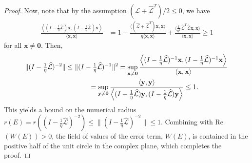 \documentclass[review]{siamart}
\begin{document}
\begin{proof}
Now, note that by the assumption $(\widehat{\mathcal{L}}+\widehat{\mathcal{L}}^T)/2 \leq 0$, we have
%
\begin{align}\label{eq:norm1}
\frac{\left\langle (I - \tfrac{1}{\eta}\widehat{\mathcal{L}})\mathbf{x},(I - \tfrac{1}{\eta}\widehat{\mathcal{L}})\mathbf{x}\right\rangle}
	{\langle\mathbf{x},\mathbf{x}\rangle} 
& = 1 - \frac{\langle (\widehat{\mathcal{L}} + \widehat{\mathcal{L}}^T )
	\mathbf{x},\mathbf{x}\rangle}{\eta \langle\mathbf{x},\mathbf{x}\rangle} +
	\frac{\langle \tfrac{1}{\eta^2}\widehat{\mathcal{L}}^T\widehat{\mathcal{L}}\mathbf{x},
	\mathbf{x}\rangle}{\langle\mathbf{x},\mathbf{x}\rangle}
\geq 1
\end{align}
%
for all $\mathbf{x}\neq\mathbf{0}$. Then,
%
\begin{align*}
\|(I - \tfrac{1}{\eta}\widehat{\mathcal{L}})^{-2}\| \leq \|(I - \tfrac{1}{\eta}\widehat{\mathcal{L}})^{-1}\|^2
& = \sup_{\mathbf{x}\neq\mathbf{0}} 
	\frac{\left\langle (I - \tfrac{1}{\eta}\widehat{\mathcal{L}})^{-1}\mathbf{x},
	(I - \tfrac{1}{\eta}\widehat{\mathcal{L}})^{-1}\mathbf{x}\right\rangle}
	{\langle\mathbf{x},\mathbf{x}\rangle} \\
&\hspace{-10ex}= \sup_{\mathbf{y}\neq\mathbf{0}} 
	\frac{\langle\mathbf{y},\mathbf{y}\rangle}{\left\langle (I - \tfrac{1}{\eta}\widehat{\mathcal{L}})\mathbf{y},
	(I - \tfrac{1}{\eta}\widehat{\mathcal{L}})\mathbf{y}\right\rangle}
\leq 1.
\end{align*}
%
This yields a bound on the numerical radius $r(E) = r((I - \tfrac{1}{\eta}\widehat{\mathcal{L}})^{-2})
\leq \|(I - \tfrac{1}{\eta}\widehat{\mathcal{L}})^{-2}\|\leq 1$. Combining with Re$(W(E)) > 0$,
the field of values of the error term, $W(E)$, is contained in the positive half of the
unit circle in the complex plane, which completes the proof.
\end{proof}
%
\end{document}
